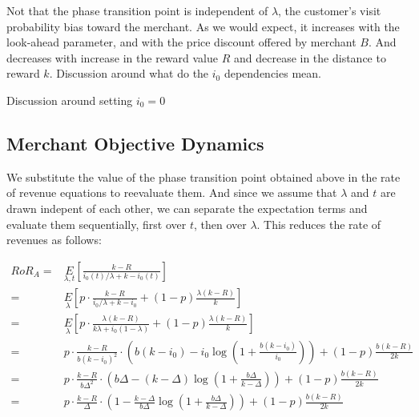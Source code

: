 Not that the phase transition point is independent of $\lambda$, the customer's visit probability bias toward the merchant.
As we would expect, it increases with the look-ahead parameter, and with the price discount offered by merchant $B$.
And decreases with increase in the reward value $R$ and decrease in the distance to reward $k$.
{\arpit Discussion around what do the $i_0$ dependencies mean.}

{\arpit Discussion around setting $i_0 = 0$}

\subsection{Merchant Objective Dynamics}
We substitute the value of the phase transition point obtained above in the rate of revenue equations to reevaluate them. 
And since we assume that $\lambda$ and $t$ are drawn indepent of each other, we can separate the expectation terms and evaluate them sequentially, first over $t$, then over $\lambda$. This reduces the rate of revenues as follows:

\begin{align*}
RoR_A =& \underset{\lambda, t}E\left[\frac{k-R}{i_0(t)/\lambda + k - i_0(t)}\right]\\
                                       =& \underset{\lambda}E\left[p\cdot\frac{k-R}{i_0/\lambda + k - i_0} + (1-p)\frac{\lambda(k-R)}{k}\right]\\
                                       =& \underset{\lambda}E\left[p\cdot\frac{\lambda(k-R)}{k\lambda + i_0(1-\lambda)} + (1-p)\frac{\lambda(k-R)}{k}\right]\\
                                       =& p\cdot\frac{k-R}{b(k-i_0)^2}\cdot\left(b(k-i_0) - i_0 \log\left(1 + \frac{b(k-i_0)}{i_0}\right)\right) + (1-p)\frac{b(k-R)}{2k}\\
                                       =& p\cdot\frac{k-R}{b\Delta^2}\cdot\left(b\Delta - (k-\Delta)\log\left(1+\frac{b\Delta}{k-\Delta}\right)\right) + (1-p)\frac{b(k-R)}{2k}\\
                                       =& p\cdot\frac{k-R}{\Delta}\cdot\left(1 - \frac{k-\Delta}{b\Delta}\log\left(1+\frac{b\Delta}{k-\Delta}\right)\right) + (1-p)\frac{b(k-R)}{2k}
\end{align*}

